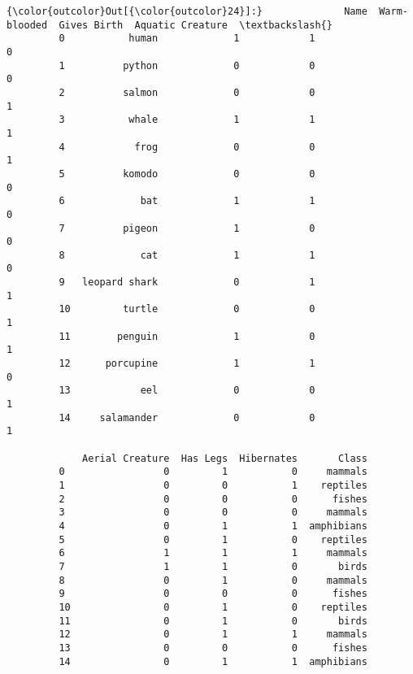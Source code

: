 \documentclass[11pt]{article}
\begin{document}
\begin{Verbatim}[commandchars=\\\{\}]
{\color{outcolor}Out[{\color{outcolor}24}]:}              Name  Warm-blooded  Gives Birth  Aquatic Creature  \textbackslash{}
         0           human             1            1                 0   
         1          python             0            0                 0   
         2          salmon             0            0                 1   
         3           whale             1            1                 1   
         4            frog             0            0                 1   
         5          komodo             0            0                 0   
         6             bat             1            1                 0   
         7          pigeon             1            0                 0   
         8             cat             1            1                 0   
         9   leopard shark             0            1                 1   
         10         turtle             0            0                 1   
         11        penguin             1            0                 1   
         12      porcupine             1            1                 0   
         13            eel             0            0                 1   
         14     salamander             0            0                 1   
         
             Aerial Creature  Has Legs  Hibernates       Class  
         0                 0         1           0     mammals  
         1                 0         0           1    reptiles  
         2                 0         0           0      fishes  
         3                 0         0           0     mammals  
         4                 0         1           1  amphibians  
         5                 0         1           0    reptiles  
         6                 1         1           1     mammals  
         7                 1         1           0       birds  
         8                 0         1           0     mammals  
         9                 0         0           0      fishes  
         10                0         1           0    reptiles  
         11                0         1           0       birds  
         12                0         1           1     mammals  
         13                0         0           0      fishes  
         14                0         1           1  amphibians  
\end{Verbatim}
            
\end{document}

